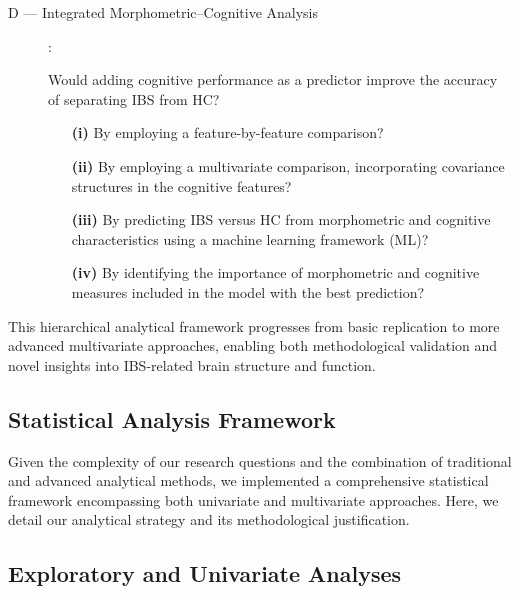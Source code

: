 \documentclass[diagnostics,article,accept,pdftex,moreauthors]{Definitions/mdpi}
\begin{document}
\begin{description}
  \item[D --- Integrated Morphometric--Cognitive Analysis]\hspace{-5pt}: 
  
  
  Would adding cognitive performance as a predictor improve the accuracy of separating IBS from HC?
  \begin{enumerate}
        \item[\textbf{(i)}] By employing a feature-by-feature comparison?
        \item[\textbf{(ii)}] By employing a multivariate comparison, incorporating covariance structures in the cognitive features?
         \item[\textbf{(iii)}] By predicting IBS versus HC from morphometric and cognitive characteristics using a machine learning framework (ML)?
          \item[\textbf{(iv)}] By identifying the importance of morphometric and cognitive measures included in the model with the best prediction?
    \end{enumerate}
\end{description}

This hierarchical analytical framework progresses from basic replication to more advanced multivariate approaches, enabling both methodological validation and novel insights into IBS-related brain structure and function. 






\subsection{Statistical Analysis Framework}
Given the complexity of our research questions and the combination of traditional and advanced analytical methods, we implemented a comprehensive statistical framework encompassing both univariate and multivariate approaches. Here, we detail our analytical strategy and its methodological justification.

\subsection{Exploratory and Univariate Analyses}
\end{document}
